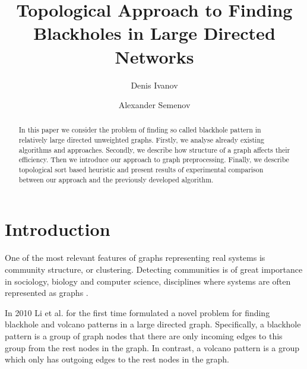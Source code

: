 \documentclass{svproc}
\begin{document}
\mainmatter              %
%
\title{Topological Approach to Finding Blackholes in Large Directed Networks}
%
%
\author{Denis Ivanov \and Alexander Semenov}
%
%
%

\maketitle              %

\begin{abstract}
In this paper we consider the problem of finding so called blackhole pattern in relatively large directed unweighted graphs.
Firstly, we analyse already existing algorithms and approaches. Secondly, we describe how structure of a graph
affects their efficiency. Then we introduce our approach to graph preprocessing. Finally, we describe topological sort based heuristic
and present results of experimental comparison between our approach and the previously developed algorithm.
\end{abstract}

\section{Introduction}

One of the most relevant features of graphs representing real systems is community
structure, or clustering. Detecting communities
is of great importance in sociology, biology and computer science, disciplines where systems are
often represented as graphs \cite{fortunato2010community}.

In 2010 Li et al.\cite{li2010detecting} for the first time formulated a novel problem for finding blackhole and volcano patterns in a large directed graph. Specifically, a blackhole pattern is a group of graph nodes 
that there are only incoming edges to this group from the rest nodes in the graph. In contrast, a volcano pattern is a
group which only has outgoing edges to the rest nodes in the graph. 
\end{document}
